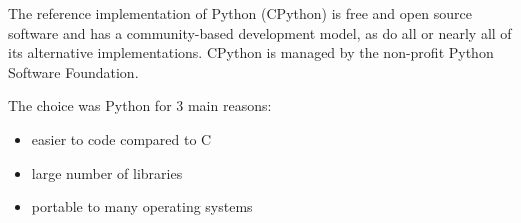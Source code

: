 The reference implementation of Python (CPython) is free and open source
software and has a community-based development model, as do all or nearly
all of its alternative implementations. CPython is managed by the
non-profit Python Software Foundation.

The choice was Python for 3 main reasons:
\begin{itemize}
\item easier to code compared to C
\item large number of libraries
\item portable to many operating systems
\end{itemize}
